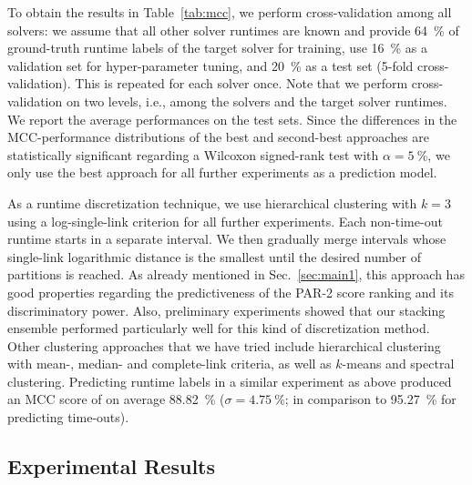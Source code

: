 \documentclass[runningheads]{llncs}
\begin{document}

To obtain the results in Table~\ref{tab:mcc}, we perform cross-validation among all solvers: we assume that all other solver runtimes are known and provide \SI{64}{\%} of ground-truth runtime labels of the target solver for training, use \SI{16}{\%} as a validation set for hyper-parameter tuning, and \SI{20}{\%} as a test set (5-fold cross-validation).
This is repeated for each solver once.
Note that we perform cross-validation on two levels, i.e., among the solvers and the target solver runtimes.
We report the average performances on the test sets.
Since the differences in the MCC-performance distributions of the best and second-best approaches are statistically significant regarding a Wilcoxon signed-rank test with $\alpha = \SI{5}{\%}$, we only use the best approach for all further experiments as a prediction model.

As a runtime discretization technique, we use hierarchical clustering with $k = 3$ using a log-single-link criterion for all further experiments.
Each non-time-out runtime starts in a separate interval.
We then gradually merge intervals whose single-link logarithmic distance is the smallest until the desired number of partitions is reached.
As already mentioned in Sec.~\ref{sec:main1}, this approach has good properties regarding the predictiveness of the PAR-2 score ranking and its discriminatory power.
Also, preliminary experiments showed that our stacking ensemble performed particularly well for this kind of discretization method.
Other clustering approaches that we have tried include hierarchical clustering with mean-, median- and complete-link criteria, as well as $k$-means and spectral clustering.
Predicting runtime labels in a similar experiment as above produced an MCC score of on average \SI{88.82}{\%} ($\sigma = \SI{4.75}{\%}$; in comparison to \SI{95.27}{\%} for predicting time-outs).

\subsection{Experimental Results}
\end{document}
